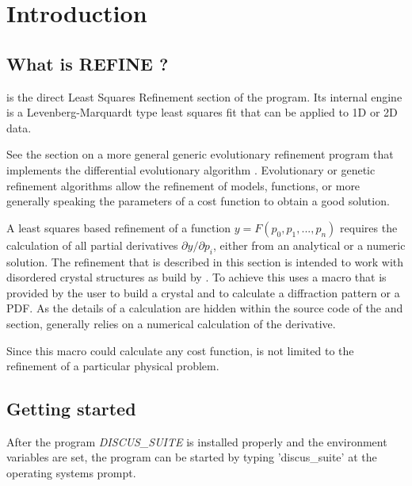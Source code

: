 
\chapter{Introduction \label{intro}}
\section{What is REFINE ?}

\Refine is the direct Least Squares Refinement section of the
\Suite program. Its internal engine is a Levenberg-Marquardt
type least squares fit that can be applied to 1D or 2D data.

See the \Diffev section on a more general 
generic evolutionary refinement program that implements the
differential evolutionary algorithm \cite{prstla2005}. Evolutionary or
genetic refinement algorithms allow the refinement of models, functions,
or more generally speaking the parameters of a cost function to obtain
a good solution. 

A least squares based refinement of a function 
$y = F(p_{0}, p_{1}, ..., p_{n})$ requires the calculation of all
partial derivatives $\partial y/ \partial p_{i}$, either from an 
analytical or a numeric solution. 
The refinement that is described in this section is intended to
work with disordered crystal structures as build by \Discus. 
To achieve this \Refine uses a macro that is provided by the user
to build a crystal and to calculate a diffraction pattern or a
PDF.  As the details of a calculation are hidden within the 
source code of the \Discus and \Kuplot section, \Refine
generally relies on a numerical calculation of the derivative. 

Since this macro could calculate any cost function, 
\Refine is not limited to the refinement of a particular physical
problem. 


\section{Getting started \label{intro-get}}

After the program {\it DISCUS\_SUITE} is installed properly and the
environment variables are set, the program can be started by typing
'discus\_suite' at the operating systems prompt.

